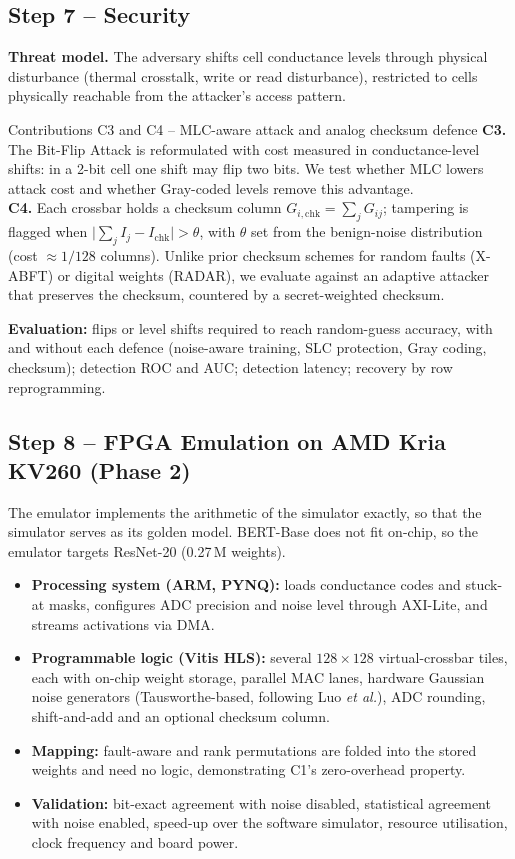 \documentclass[10pt,a4paper]{article}
\begin{document}
\subsection{Step 7 -- Security}
\textbf{Threat model.} The adversary shifts cell conductance levels through physical disturbance
(thermal crosstalk, write or read disturbance), restricted to cells physically reachable from the
attacker's access pattern.

\begin{contribbox}{Contributions C3 and C4 -- MLC-aware attack and analog checksum defence}
\textbf{C3.} The Bit-Flip Attack is reformulated with cost measured in conductance-level shifts: in a
2-bit cell one shift may flip two bits. We test whether MLC lowers attack cost and whether Gray-coded
levels remove this advantage.\\[2pt]
\textbf{C4.} Each crossbar holds a checksum column $G_{i,\mathrm{chk}}=\sum_j G_{ij}$; tampering is
flagged when $\big|\sum_j I_j-I_{\mathrm{chk}}\big|>\theta$, with $\theta$ set from the benign-noise
distribution (cost $\approx1/128$ columns). Unlike prior checksum schemes for random faults (X-ABFT) or
digital weights (RADAR), we evaluate against an adaptive attacker that preserves the checksum, countered
by a secret-weighted checksum.
\end{contribbox}

\textbf{Evaluation:} flips or level shifts required to reach random-guess accuracy, with and without
each defence (noise-aware training, SLC protection, Gray coding, checksum); detection ROC and AUC;
detection latency; recovery by row reprogramming.

\subsection{Step 8 -- FPGA Emulation on AMD Kria KV260 (Phase 2)}
The emulator implements the arithmetic of the simulator exactly, so that the simulator serves as its
golden model. BERT-Base does not fit on-chip, so the emulator targets ResNet-20 (0.27\,M weights).
\begin{itemize}
\item \textbf{Processing system (ARM, PYNQ):} loads conductance codes and stuck-at masks, configures ADC
precision and noise level through AXI-Lite, and streams activations via DMA.
\item \textbf{Programmable logic (Vitis HLS):} several $128\times128$ virtual-crossbar tiles, each with
on-chip weight storage, parallel MAC lanes, hardware Gaussian noise generators (Tausworthe-based,
following Luo \emph{et al.}), ADC rounding, shift-and-add and an optional checksum column.
\item \textbf{Mapping:} fault-aware and rank permutations are folded into the stored weights and need
no logic, demonstrating C1's zero-overhead property.
\item \textbf{Validation:} bit-exact agreement with noise disabled, statistical agreement with noise
enabled, speed-up over the software simulator, resource utilisation, clock frequency and board power.
\end{itemize}
\end{document}
